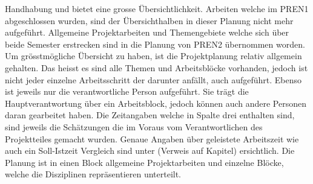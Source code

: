 Handhabung und bietet eine grosse Übersichtlichkeit. Arbeiten welche im PREN1 
abgeschlossen wurden, sind der Übersichthalben in dieser Planung nicht mehr 
aufgeführt. Allgemeine Projektarbeiten und Themengebiete welche sich über beide 
Semester erstrecken sind in die Planung von PREN2 übernommen worden. Um 
grösstmögliche Übersicht zu haben, ist die Projektplanung relativ allgemein 
gehalten. Das heisst es sind alle Themen und Arbeitsblöcke vorhanden, jedoch 
ist nicht jeder einzelne Arbeitsschritt der darunter anfällt, auch aufgeführt. 
Ebenso ist jeweils nur die verantwortliche Person aufgeführt. Sie trägt die Hauptverantwortung über ein Arbeitsblock, jedoch können auch andere Personen 
daran gearbeitet haben. Die Zeitangaben welche in Spalte drei enthalten sind, 
sind jeweils die Schätzungen die im Voraus vom Verantwortlichen des Projektteiles 
gemacht wurden. Genaue Angaben über geleistete Arbeitszeit wie auch ein 
Soll-Istzeit Vergleich sind unter (Verweis auf Kapitel) ersichtlich. Die Planung 
ist in einen Block allgemeine Projektarbeiten und einzelne Blöcke, welche die 
Disziplinen repräsentieren unterteilt.
